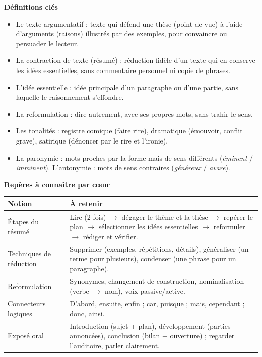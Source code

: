\documentclass[11pt]{article}
\newcommand{\cle}[1]{{\popxbold\color{popdark}#1}}
\begin{document}
\begin{bilan}
\textbf{Définitions clés}
\begin{itemize}
\item Le \cle{texte argumentatif} : texte qui défend une \cle{thèse} (point de vue) à l'aide d'\cle{arguments} (raisons) illustrés par des \cle{exemples}, pour convaincre ou persuader le lecteur.
\item La \cle{contraction de texte} (résumé) : réduction fidèle d'un texte qui en conserve les idées essentielles, sans commentaire personnel ni copie de phrases.
\item L'\cle{idée essentielle} : idée principale d'un paragraphe ou d'une partie, sans laquelle le raisonnement s'effondre.
\item La \cle{reformulation} : dire autrement, avec ses propres mots, sans trahir le sens.
\item Les \cle{tonalités} : registre \cle{comique} (faire rire), \cle{dramatique} (émouvoir, conflit grave), \cle{satirique} (dénoncer par le rire et l'ironie).
\item La \cle{paronymie} : mots proches par la forme mais de sens différents (\emph{éminent} / \emph{imminent}). L'\cle{antonymie} : mots de sens contraires (\emph{généreux} / \emph{avare}).
\end{itemize}

\textbf{Repères à connaître par cœur}
\begin{center}
\begin{tabularx}{\linewidth}{|l|X|}\hline
\rowcolor{popblueL} \textbf{Notion} & \textbf{À retenir} \\ \hline
Étapes du résumé & Lire (2 fois) $\rightarrow$ dégager le thème et la thèse $\rightarrow$ repérer le plan $\rightarrow$ sélectionner les idées essentielles $\rightarrow$ reformuler $\rightarrow$ rédiger et vérifier. \\ \hline
Techniques de réduction & Supprimer (exemples, répétitions, détails), généraliser (un terme pour plusieurs), condenser (une phrase pour un paragraphe). \\ \hline
Reformulation & Synonymes, changement de construction, nominalisation (verbe $\rightarrow$ nom), voix passive/active. \\ \hline
Connecteurs logiques & D'abord, ensuite, enfin ; car, puisque ; mais, cependant ; donc, ainsi. \\ \hline
Exposé oral & Introduction (sujet + plan), développement (parties annoncées), conclusion (bilan + ouverture) ; regarder l'auditoire, parler clairement. \\ \hline
\end{tabularx}
\end{center}


\end{bilan}
\end{document}
